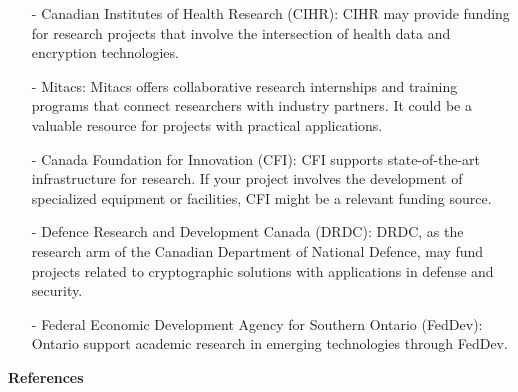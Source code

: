 \begin {itemize}
\begin{itemize}
    IBM Research: Companies like IBM have research divisions that may fund projects related to cryptography and encryption.\\
    Microsoft Research: Microsoft has an interest in various areas of cryptography and may provide research grants.
\item [-]
    Canadian Institutes of Health Research (CIHR):
        CIHR may provide funding for research projects that involve the intersection of health data and encryption technologies.
\item [-]
    Mitacs:
        Mitacs offers collaborative research internships and training programs that connect researchers with industry partners. It could be a valuable resource for projects with practical applications.
\item [-]
    Canada Foundation for Innovation (CFI):
        CFI supports state-of-the-art infrastructure for research. If your project involves the development of specialized equipment or facilities, CFI might be a relevant funding source.
\item [-]
    Defence Research and Development Canada (DRDC):
        DRDC, as the research arm of the Canadian Department of National Defence, may fund projects related to cryptographic solutions with applications in defense and security.
\item [-]
    Federal Economic Development Agency for Southern Ontario (FedDev):
        Ontario support academic research in emerging technologies through FedDev.
\end{itemize}

 \end {itemize}
\hspace*{-1.8em}
{\bf References} \\

